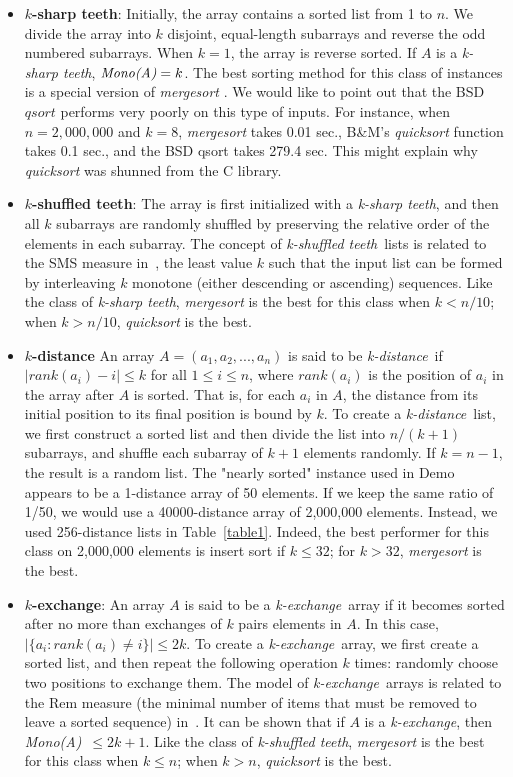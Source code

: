 \documentclass[AMA,STIX1COL]{WileyNJD-v2}
\newcommand{\ksha}{\emph{k-sharp teeth}}
\newcommand{\kshu}{\emph{k-shuffled teeth}}
\newcommand{\kdis}{\emph{k-distance}}
\newcommand{\kexc}{\emph{k-exchange}}
\newcommand {\mono}{\emph{Mono(A)}}
\newcommand{\qusort}{\emph{quicksort }}
\newcommand{\msort}{\emph{mergesort }}
\begin{document}
\begin{itemize}
\item \textbf{$k$-sharp teeth}:
Initially, the array contains a sorted list from 1 to $n$. 
We divide the array into $k$ disjoint, equal-length subarrays and reverse the odd numbered subarrays.  
When $k =1$, the array is reverse sorted. 
If $A$ is a \ksha, $\mono = k$.  
The best sorting method for this class of instances is a special version of \msort. 
We would like to point out that the BSD $qsort$ performs very poorly on this type of inputs. 
For instance, when $n = 2,000,000$ and $k = 8$, \msort takes 0.01 sec., B\&M's \qusort function takes 0.1 sec., and the BSD qsort takes 279.4 sec. 
This might explain why \qusort was shunned from the C library.

\item \textbf{$k$-shuffled teeth}: 
The array is first initialized with a \ksha, and then all $k$ subarrays are randomly shuffled by preserving the relative order of the elements in each subarray.
The concept of \kshu \ lists is related to the SMS measure in~\cite{moffat1996splaysort}, the least value $k$ such that the input list can be formed by interleaving $k$ monotone (either descending or ascending) sequences.  
Like the class of \ksha, \msort is the best for this class when $k < n/10$; when $k > n/10$, \qusort is the best. 

\item \textbf{$k$-distance}
An array $A = (a_1, a_2, ..., a_n)$ is said to be \kdis \ if $|rank(a_i) -  i| \leq k$ for all $1\leq i \leq n$, where $rank(a_i)$ is the position of $a_i$ in the array after $A$ is sorted. 
That is, for each $a_i$ in $A$, the distance from its initial position to its final position is bound by $k$. 
To create a \kdis \ list, we first construct a sorted list and then divide the list into $n/(k+1)$ subarrays, and shuffle each subarray of $k+1$ elements randomly.  
If $k = n -1$, the result is a random list. 
The "nearly sorted" instance used in Demo appears to be a 1-distance array of 50 elements.  
If we keep the same ratio of 1/50, we would use a 40000-distance array of 2,000,000 elements. 
Instead, we used 256-distance lists in Table~\ref{table1}. 
Indeed, the best performer for this class on 2,000,000 elements is insert sort if $k \leq 32$; for $k > 32$, \msort is the best.

\item \textbf{$k$-exchange}: An array $A$ is said to be a \kexc \ array if it becomes sorted after no more than exchanges of $k$ pairs elements in $A$. 
In this case,  $|\{a_i : rank(a_i) \neq i\}| \leq 2k$.  
To create a \kexc \ array, we first create a sorted list, and then repeat the following operation $k$ times: randomly choose two positions to exchange them. 
The model of \kexc \ arrays is related to the Rem measure (the minimal number of items that must be removed to leave a sorted sequence) in~\cite{moffat1996splaysort}. 
It can be shown that if $A$ is a \kexc, then \mono\ $\leq 2k+1$. 
Like the class of \kshu, \msort is the best for this class when $k \leq n$; when $k > n$, \qusort is the best.                                                
\end{itemize}              
\end{document}
